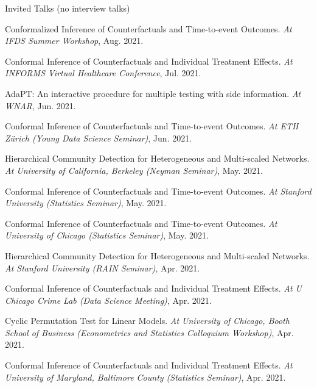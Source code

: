\documentclass{article}
\begin{document}
\begin{large}
\noindent Invited Talks (no interview talks)
\end{large}

\vspace{2mm}
Conformalized Inference of Counterfactuals and Time-to-event Outcomes. \emph{At IFDS Summer Workshop}, Aug. 2021.

\vspace{2mm}
Conformal Inference of Counterfactuals and Individual Treatment Effects. \emph{At INFORMS Virtual Healthcare Conference}, Jul. 2021.

\vspace{2mm}
AdaPT: An interactive procedure for multiple testing with side information. \emph{At WNAR}, Jun. 2021.

\vspace{2mm}
Conformal Inference of Counterfactuals and Time-to-event Outcomes. \emph{At ETH Z\"{u}rich (Young Data Science Seminar)}, Jun. 2021.

\vspace{2mm}
Hierarchical Community Detection for Heterogeneous and Multi-scaled Networks. \emph{At University of California, Berkeley (Neyman Seminar)}, May. 2021.

\vspace{2mm}
Conformal Inference of Counterfactuals and Time-to-event Outcomes. \emph{At Stanford University (Statistics Seminar)}, May. 2021.

\vspace{2mm}
Conformal Inference of Counterfactuals and Time-to-event Outcomes. \emph{At University of Chicago (Statistics Seminar)}, May. 2021.

\vspace{2mm}
Hierarchical Community Detection for Heterogeneous and Multi-scaled Networks. \emph{At Stanford University (RAIN Seminar)}, Apr. 2021.

\vspace{2mm}
Conformal Inference of Counterfactuals and Individual Treatment Effects. \emph{At U Chicago Crime Lab (Data Science Meeting)}, Apr. 2021.

\vspace{2mm}
Cyclic Permutation Test for Linear Models. \emph{At University of Chicago, Booth School of Business (Econometrics and Statistics Colloquium Workshop)}, Apr. 2021.

\vspace{2mm}
Conformal Inference of Counterfactuals and Individual Treatment Effects. \emph{At University of Maryland, Baltimore County (Statistics Seminar)}, Apr. 2021.
\end{document}

